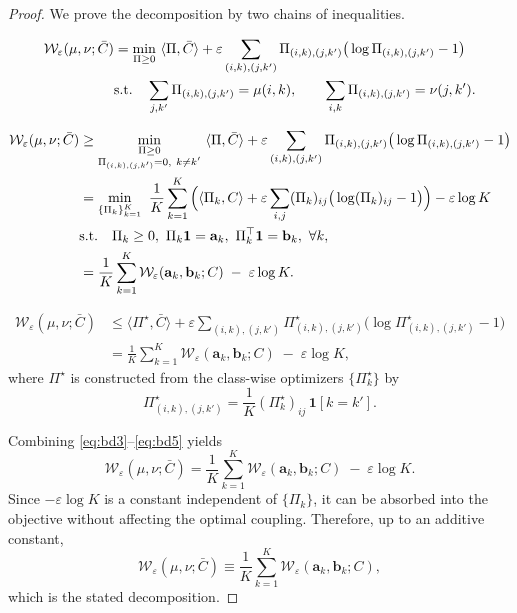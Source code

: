 \begin{proof}
We prove the decomposition by two chains of inequalities.

\begin{align}
\mathcal{W}_{\varepsilon}(\mu,\nu;\bar C)
&=
\min_{\Pi\ge 0}\ \langle \Pi,\bar C\rangle
+\varepsilon\sum_{(i,k),(j,k')} \Pi_{(i,k),(j,k')}\big(\log \Pi_{(i,k),(j,k')}-1\big)
\label{eq:bd0}\\
&\text{s.t.}\quad
\sum_{j,k'} \Pi_{(i,k),(j,k')}=\mu(i,k),\qquad
\sum_{i,k} \Pi_{(i,k),(j,k')}=\nu(j,k').
\notag
\end{align}

\begin{align}
\mathcal{W}_{\varepsilon}(\mu,\nu;\bar C)
&\ge
\min_{\substack{\Pi\ge 0\\ \Pi_{(i,k),(j,k')}=0,\ k\neq k'}}\ 
\langle \Pi,\bar C\rangle
+\varepsilon\sum_{(i,k),(j,k')} \Pi_{(i,k),(j,k')}\big(\log \Pi_{(i,k),(j,k')}-1\big)
\label{eq:bd1}\\
&=
\min_{\{\Pi_k\}_{k=1}^{K}}\ 
\frac{1}{K}\sum_{k=1}^{K}
\Big(
\langle \Pi_k,C\rangle
+\varepsilon\sum_{i,j}(\Pi_k)_{ij}\big(\log (\Pi_k)_{ij}-1\big)
\Big)
-\varepsilon\log K
\label{eq:bd2}\\
&\text{s.t.}\quad
\Pi_k\ge 0,\ \Pi_k\mathbf{1}=\mathbf{a}_k,\ \Pi_k^\top\mathbf{1}=\mathbf{b}_k,\ \forall k,
\notag\\
&=
\frac{1}{K}\sum_{k=1}^{K}\mathcal{W}_{\varepsilon}(\mathbf{a}_k,\mathbf{b}_k;C)\;-\;\varepsilon\log K.
\label{eq:bd3}
\end{align}

\begin{align}
\mathcal{W}_{\varepsilon}(\mu,\nu;\bar C)
&\le
\langle \Pi^\star,\bar C\rangle
+\varepsilon\sum_{(i,k),(j,k')} \Pi^\star_{(i,k),(j,k')}\big(\log \Pi^\star_{(i,k),(j,k')}-1\big)
\label{eq:bd4}\\
&=
\frac{1}{K}\sum_{k=1}^{K}\mathcal{W}_{\varepsilon}(\mathbf{a}_k,\mathbf{b}_k;C)\;-\;\varepsilon\log K,
\label{eq:bd5}
\end{align}
where $\Pi^\star$ is constructed from the class-wise optimizers $\{\Pi_k^\star\}$ by
\[
\Pi^\star_{(i,k),(j,k')}=\frac{1}{K}(\Pi_k^\star)_{ij}\,\mathbf{1}[k=k'].
\]

Combining \eqref{eq:bd3}--\eqref{eq:bd5} yields
\begin{equation} 
\mathcal{W}_{\varepsilon}(\mu,\nu;\bar C)
=
\frac{1}{K}\sum_{k=1}^{K}\mathcal{W}_{\varepsilon}(\mathbf{a}_k,\mathbf{b}_k;C)\;-\;\varepsilon\log K.
\end{equation}
Since $-\varepsilon\log K$ is a constant independent of $\{\Pi_k\}$, it can be absorbed into the objective without affecting the optimal coupling. Therefore, up to an additive constant,
\begin{equation}
\mathcal{W}_{\varepsilon}(\mu,\nu;\bar C)
\equiv
\frac{1}{K}\sum_{k=1}^{K}\mathcal{W}_{\varepsilon}(\mathbf{a}_k,\mathbf{b}_k;C),
\end{equation}
which is the stated decomposition.
\end{proof}


